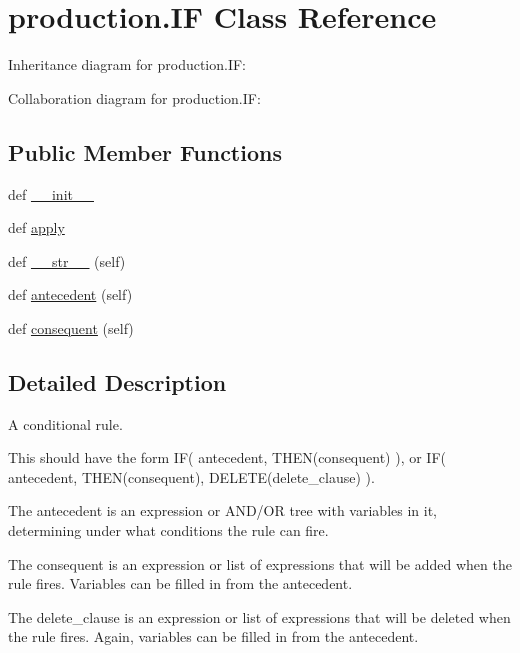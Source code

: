 \hypertarget{classproduction_1_1_i_f}{}\section{production.\+I\+F Class Reference}
\label{classproduction_1_1_i_f}


Inheritance diagram for production.\+I\+F\+:


Collaboration diagram for production.\+I\+F\+:
\subsection*{Public Member Functions}
\begin{DoxyCompactItemize}
\item 
def \hyperlink{classproduction_1_1_i_f_a9017c2c3d1ca4982ebc9dc58afc2b750}{\+\_\+\+\_\+init\+\_\+\+\_\+}
\item 
def \hyperlink{classproduction_1_1_i_f_a8d8249f6e0329407f77f23f9eede1342}{apply}
\item 
def \hyperlink{classproduction_1_1_i_f_a913c0fb435ac0a64a1ddf956fd9376c1}{\+\_\+\+\_\+str\+\_\+\+\_\+} (self)
\item 
def \hyperlink{classproduction_1_1_i_f_a57e2be295731642cad9b4fb43239ed33}{antecedent} (self)
\item 
def \hyperlink{classproduction_1_1_i_f_a5568bdf2f662fb1f9a143ace153fccf6}{consequent} (self)
\end{DoxyCompactItemize}


\subsection{Detailed Description}
\begin{DoxyVerb}A conditional rule.

This should have the form IF( antecedent, THEN(consequent) ),
or IF( antecedent, THEN(consequent), DELETE(delete_clause) ).

The antecedent is an expression or AND/OR tree with variables
in it, determining under what conditions the rule can fire.

The consequent is an expression or list of expressions that
will be added when the rule fires. Variables can be filled in
from the antecedent.

The delete_clause is an expression or list of expressions
that will be deleted when the rule fires. Again, variables
can be filled in from the antecedent.
\end{DoxyVerb}
 

